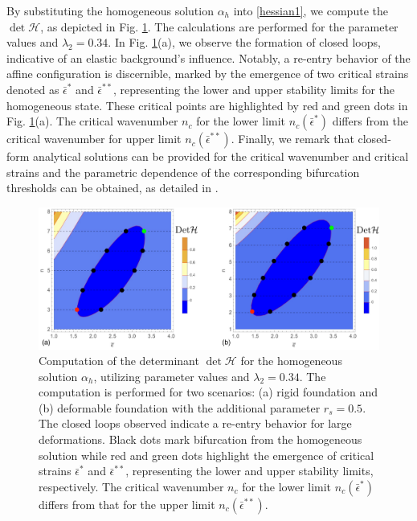 % 
By substituting the homogeneous solution $\alpha_h$ into \eqref{hessian1}, we compute  the $\det \mathcal{H}$, as depicted  in Fig. \ref{fig:hessian1}. The calculations are performed for the parameter values  and $\lambda_2=0.34$.
In Fig. \ref{fig:hessian1}(a), we observe the formation of closed loops, indicative of an elastic background's influence. Notably, a re-entry behavior of the affine configuration is discernible, marked by the emergence of two critical strains denoted as $\bar\epsilon^*$ and $\bar\epsilon^{**}$, representing the lower and upper stability limits for the homogeneous state. These critical points are highlighted by red and green dots in Fig. \ref{fig:hessian1}(a). The critical wavenumber $n_c$ for the lower limit $n_c(\bar{\epsilon}^*)$    differs from the critical wavenumber for  upper limit $n_c(\bar{\epsilon}^{**})$. Finally, we remark that closed-form analytical solutions can be provided for the critical wavenumber and critical strains and the parametric dependence of the corresponding bifurcation thresholds can be obtained, as detailed in \cite{Salman2021-mn}.


\begin{figure}
     \centering
     \includegraphics[scale=0.25]{./final_images/fig1.pdf}
\caption{
Computation of the determinant $\det \mathcal{H}$ for the homogeneous solution $\alpha_h$, utilizing parameter values  and $\lambda_2 = 0.34$. The computation is performed for two scenarios: (a) rigid foundation and (b) deformable foundation with the additional parameter $r_s=0.5$. The closed loops observed indicate a re-entry behavior for large deformations. Black dots mark bifurcation from the homogeneous solution while red and green dots highlight the emergence of critical strains $\bar{\epsilon}^*$ and $\bar{\epsilon}^{**}$, representing the lower and upper stability limits, respectively. The critical wavenumber $n_c$ for the lower limit $n_c(\bar{\epsilon}^*)$ differs from that for the upper limit $n_c(\bar{\epsilon}^{**})$.}
     \label{fig:hessian1}
 \end{figure}


